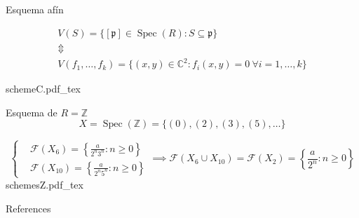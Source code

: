 \documentclass[10pt]{beamer}
\DeclareMathOperator{\Spec}{Spec}
\newcommand{\incfig}[1]{%
\center
\def\svgwidth{0.9\columnwidth}
{#1.pdf_tex}
}
\begin{document}
\begin{frame}[fragile]{Esquema afín}

\begin{gather*}
V(S) = \{[\mathfrak{p} ] \in \Spec(R) : S \subseteq \mathfrak{p}  \}\\
\Updownarrow\\
V(f_1, \dots, f_k) = \{(x,y) \in \mathbb{C}^2: f_i(x,y) = 0 \ \forall  i = 1,\dots,k \}
\end{gather*}

\incfig{schemeC}

\end{frame}


\begin{frame}[fragile]{Esquema de $R = \mathbb{Z}$}
\[
X = \Spec(\mathbb{Z}) = \{(0),(2), (3), (5), \ldots\}
\]

\[
    \begin{cases}
&\mathcal{F}(X_6)  = \left\{ \frac{a}{2^n3^n} : n \ge 0 \right\}\\
&\mathcal{F}(X_{10})  = \left\{ \frac{a}{2^n5^n} : n \ge 0 \right\} 
    \end{cases}   \implies 
    \mathcal{F}(X_6 \cup X_{10}) = \mathcal{F}(X_2)  = \left\{ \frac{a}{2^n} : n \ge 0\right\}
\]
\incfig{schemesZ}
\end{frame}








\begin{frame}[allowframebreaks]{References}

\nocite{*}



\end{frame}
\end{document}
